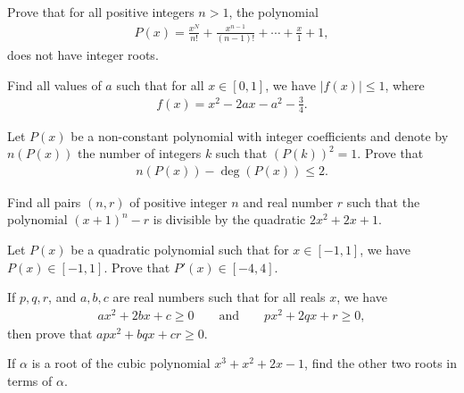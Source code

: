 \documentclass[12pt,a4paper]{memoir}
\theoremstyle{definition}
\begin{document}
\begin{question}[name={1989 Iran Second Round}]
	Prove that for all positive integers $n>1$, the polynomial
	\begin{align*}
		P(x)= \frac{x^N}{n!} + \frac{x^{n-1}}{(n-1)!} + \cdots + \frac{x}{1} + 1,
	\end{align*}
	does not have integer roots.
\end{question}


\begin{question}[name={1997 Bulgaria}]
	Find all values of $a$ such that for all $x\in [0,1]$, we have $|f(x)|\leq 1$, where
	\begin{align*}
		f(x) = x^2 - 2ax - a^2 - \frac{3}{4}.
	\end{align*}
\end{question}


\begin{question}[name={1974 International Mathematics Olympiad}]
	Let $P(x)$ be a non-constant polynomial with integer coefficients and denote by $n(P(x))$ the number of integers $k$ such that $(P(k))^2=1$. Prove that
	\begin{align*}
		n(P(x)) - \deg(P(x)) \leq 2.
	\end{align*}
\end{question}

\begin{question}[name={1996 Poland}]
	Find all pairs $(n,r)$ of positive integer $n$ and real number $r$ such that the polynomial $(x+1)^n-r$ is divisible by the quadratic $2x^2+2x+1$.
\end{question}


\begin{question}[name={1914 Hungary}]
	Let $P(x)$ be a quadratic polynomial such that for $x\in [-1,1]$, we have $P(x)\in [-1,1]$. Prove that $P'(x) \in [-4,4]$.
\end{question}




\begin{question}[name={1918 Hungary}]
	If $p,q,r$, and $a,b,c$ are real numbers such that for all reals $x$, we have
	\begin{align*}
		ax^2+2bx+c \geq 0 \qquad \text{and} \qquad px^2+2qx+r \geq 0,
	\end{align*}
	then prove that $apx^2+bqx+cr \geq 0$. 
\end{question}



\begin{question}[name={1988 Iran}]
	If $\alpha$ is a root of the cubic polynomial $x^3+x^2+2x-1$, find the other two roots in terms of $\alpha$.
\end{question}
\end{document}
